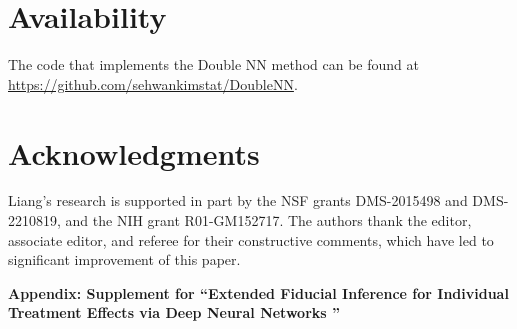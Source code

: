 \documentclass[11pt]{article}
\newcommand{\bX}{{\boldsymbol X}}
\newcommand{\bY}{{\boldsymbol Y}}
\newcommand{\bx}{{\boldsymbol x}}
\newcommand{\bZ}{{\boldsymbol Z}}
\newcommand{\bw}{{\boldsymbol w}}
\newcommand{\btheta}{{\boldsymbol \theta}}
\begin{document}
 
 

\section*{Availability} 

The code that implements the Double NN method can be found at \url{https://github.com/sehwankimstat/DoubleNN}.

\section*{Acknowledgments} 
  
Liang's research is supported in part by the NSF grants DMS-2015498 and DMS-2210819, and the NIH grant R01-GM152717. The authors thank the editor, associate editor, and referee for their constructive comments, which 
have led to significant improvement of this paper. 

 
%
%

\newpage

 
\appendix

{\Large \bf Appendix: Supplement for ``Extended Fiducial Inference for Individual Treatment Effects via
Deep Neural Networks ''} 
\end{document}
